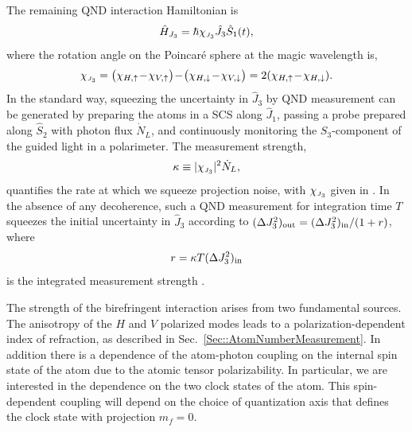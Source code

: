 \documentclass[aps,pra,twocolumn]{revtex4-1} %
\newcommand{\inp}{{\rm in}}
\newcommand{\jx}{\hat{J}_1}
\newcommand{\jz}{\hat{J}_3}
\newcommand{\chieff}{\chi_{\raisebox{-.1pt}{\tiny $J_3$}}}
\begin{document}
The remaining QND interaction Hamiltonian is
	\begin{equation} \label{Eq::FaradayHam}
		\hat{H}_{J_3} = \hbar \chieff \jz \hat{S}_1(t),
	\end{equation}
where the rotation angle on the Poincar\'{e} sphere at the magic wavelength is,
\begin{equation}\label{eq:chiJ3}
\chieff = \big( \chi_{H, \uparrow} \!-\! \chi_{V,\uparrow} \big) \!-\! \big(\chi_{H,\downarrow} \!-\! \chi_{V,\downarrow} \big) = 2(\chi_{H, \uparrow}\!-\!\chi_{H, \downarrow}).
\end{equation}
In the standard way, squeezing the uncertainty in $\jz$ by QND measurement can be generated by preparing the atoms in a SCS along $\jx$, passing a probe prepared along $\hat{S}_2$ with photon flux $\dot{N}_L$, and continuously monitoring the $S_3$-component of the guided light in a polarimeter. The measurement strength,
	\begin{align} \label{Eq::MeasurementStrength}
		\kappa \equiv |\chieff|^2 \dot{N}_L, 
	\end{align}
quantifies the rate at which we squeeze projection noise, with $\chieff$ given in . 
In the absence of any decoherence, such a QND measurement for integration time $T$ squeezes the initial uncertainty in $\jz$ according to $(\Delta J_3^2)_{\rm out}= (\Delta J_3^2)_{\rm in}/(1+r)$, where
	\begin{equation}
		r = \kappa T  (\Delta J_3^2)_{\inp}
	\end{equation}
is the integrated measurement strength \cite{hammerer_quantum_2010, baragiola_three-dimensional_2014}.

The strength of the birefringent interaction arises from two fundamental sources.  The anisotropy of the   $H$ and $V$ polarized modes leads to a polarization-dependent index of refraction, as described in Sec.~\ref{Sec::AtomNumberMeasurement}.  In addition there is a dependence of the atom-photon coupling on the internal spin state of the atom due to the atomic tensor polarizability.  In particular, we are interested in the dependence on the two clock states of the atom.  This spin-dependent coupling will depend on the choice of quantization axis that defines the clock state with projection $m_f=0$. 
\end{document}
